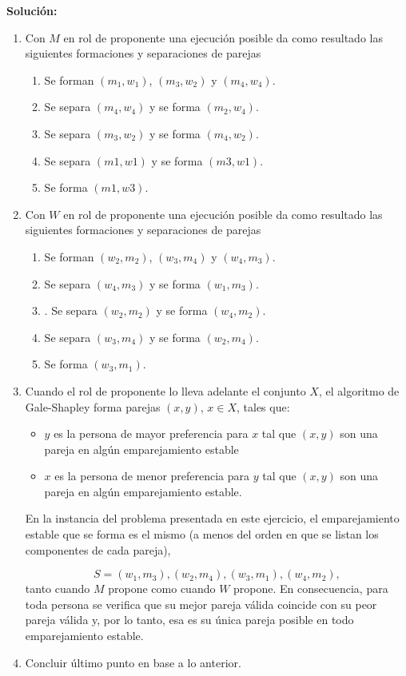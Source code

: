 \documentclass{article}
\begin{document}
\textbf{Solución:} 

\begin{enumerate}[label=\alph*)]
    \item Con $M$ en rol de proponente una ejecución posible da como resultado las siguientes formaciones y
separaciones de parejas
    \begin{enumerate}[label=\arabic*.]
        \item Se forman $(m_1, w_1)$, $(m_3, w_2)$ y $(m_4, w_4)$.
        \item Se separa $(m_4, w_4)$ y se forma $(m_2, w_4)$.
        \item Se separa $(m_3, w_2)$ y se forma $(m_4, w_2)$.
        \item Se separa $(m1, w1)$ y se forma $(m3, w1)$.
        \item Se forma $(m1, w3)$.
    \end{enumerate}
    \item Con $W$ en rol de proponente una ejecución posible da como resultado las siguientes formaciones y
separaciones de parejas
    \begin{enumerate}[label=\arabic*.]
        \item Se forman $(w_2, m_2)$, $(w_3, m_4)$ y $(w_4, m_3)$.
        \item Se separa $(w_4, m_3)$ y se forma $(w_1, m_3)$.
        \item . Se separa $(w_2, m_2)$ y se forma $(w_4, m_2)$.
        \item Se separa $(w_3, m_4)$ y se forma $(w_2, m_4)$.
        \item Se forma $(w_3, m_1)$.
    \end{enumerate}
    \item Cuando el rol de proponente lo lleva adelante el conjunto $X$, el algoritmo de Gale-Shapley forma
parejas $(x, y)$, $x \in X$, tales que:
    \begin{itemize}
        \item $y$ es la persona de mayor preferencia para $x$ tal que $(x, y)$ son una pareja en algún emparejamiento estable
        \item $x$ es la persona de menor preferencia para $y$ tal que $(x, y)$ son una pareja en algún emparejamiento estable.
    \end{itemize}
    En la instancia del problema presentada en este ejercicio, el emparejamiento estable que se forma es
el mismo (a menos del orden en que se listan los componentes de cada pareja),

$$S = {(w_1, m_3),(w_2, m_4),(w_3, m_1),(w_4, m_2)} ,$$
tanto cuando $M$ propone como cuando $W$ propone. En consecuencia, para toda persona se verifica
que su mejor pareja válida coincide con su peor pareja válida y, por lo tanto, esa es su única pareja
posible en todo emparejamiento estable.

\item Concluir último punto en base a lo anterior.
\end{enumerate}
\end{document}
